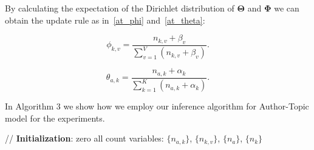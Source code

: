 {By calculating the expectation of the Dirichlet distribution of $\boldsymbol{\Theta}$ and $\boldsymbol{\Phi}$ we can obtain the update rule as in~\eqref{at_phi} and~\eqref{at_theta}:


\begin{equation}\label{at_phi}
\phi_{k,v} = \frac{n_{k,v} + \beta_{v}}{\sum_{v=1}^V(n_{k,v} + \beta_v)}.
\end{equation}

\begin{equation}\label{at_theta}
\theta_{a,k} = \frac{n_{a,k} + \alpha_{k}}{\sum_{k=1}^K(n_{a,k} + \alpha_k)}.
\end{equation}

In Algorithm 3 we show how we employ our inference algorithm for Author-Topic model for the experiments. 


\begin{algorithm}\label{algo:AT}
\DontPrintSemicolon
\LinesNotNumbered
 

    {// \textbf{Initialization}:}\;
    zero all count variables: $\{n_{a,k}\}$, $\{n_{k,v}\}$, $\{n_{a}\}$, $\{n_{k}\}$\;
    

\end{algorithm}}
